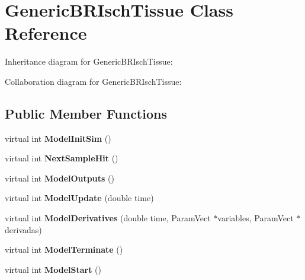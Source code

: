 \hypertarget{classGenericBRIschTissue}{}\section{Generic\+B\+R\+Isch\+Tissue Class Reference}
\label{classGenericBRIschTissue}


Inheritance diagram for Generic\+B\+R\+Isch\+Tissue\+:


Collaboration diagram for Generic\+B\+R\+Isch\+Tissue\+:
\subsection*{Public Member Functions}
\begin{DoxyCompactItemize}
\item 
virtual int {\bfseries Model\+Init\+Sim} ()\hypertarget{classGenericBRIschTissue_abc2faeec4111d67038453d97dabed873}{}\label{classGenericBRIschTissue_abc2faeec4111d67038453d97dabed873}

\item 
virtual int {\bfseries Next\+Sample\+Hit} ()\hypertarget{classGenericBRIschTissue_ac44db367a9af155b503aeb226034ab60}{}\label{classGenericBRIschTissue_ac44db367a9af155b503aeb226034ab60}

\item 
virtual int {\bfseries Model\+Outputs} ()\hypertarget{classGenericBRIschTissue_a93afda79cc9d7826fc6dab3dc6e49d6c}{}\label{classGenericBRIschTissue_a93afda79cc9d7826fc6dab3dc6e49d6c}

\item 
virtual int {\bfseries Model\+Update} (double time)\hypertarget{classGenericBRIschTissue_aaa0d04407ed32840fb4fdc8a24160720}{}\label{classGenericBRIschTissue_aaa0d04407ed32840fb4fdc8a24160720}

\item 
virtual int {\bfseries Model\+Derivatives} (double time, Param\+Vect $\ast$variables, Param\+Vect $\ast$derivadas)\hypertarget{classGenericBRIschTissue_a37d6afd28135fe2f3919fa0d2cca7c47}{}\label{classGenericBRIschTissue_a37d6afd28135fe2f3919fa0d2cca7c47}

\item 
virtual int {\bfseries Model\+Terminate} ()\hypertarget{classGenericBRIschTissue_a568b7e6abee2417c20198541a4e85f7f}{}\label{classGenericBRIschTissue_a568b7e6abee2417c20198541a4e85f7f}

\item 
virtual int {\bfseries Model\+Start} ()\hypertarget{classGenericBRIschTissue_a44924cfdd87f8e55f0b2e1d164ae9903}{}\label{classGenericBRIschTissue_a44924cfdd87f8e55f0b2e1d164ae9903}


\end{DoxyCompactItemize}
